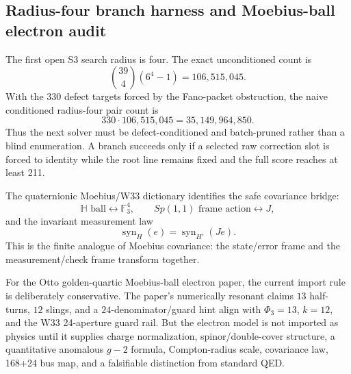 \subsection{Radius-four branch harness and Moebius-ball electron audit}
\label{sec:bt1435-bt1437-radius4-mobius-audit}

The first open S3 search radius is four.  The exact unconditioned count is
\[
\binom{39}{4}(6^4-1)=106{,}515{,}045.
\]
With the 330 defect targets forced by the Fano-packet obstruction, the naive
conditioned radius-four pair count is
\[
330\cdot106{,}515{,}045=35{,}149{,}964{,}850.
\]
Thus the next solver must be defect-conditioned and batch-pruned rather than a
blind enumeration.  A branch succeeds only if a selected raw correction slot is
forced to identity while the root line remains fixed and the full score reaches
at least 211.

The quaternionic Moebius/W33 dictionary identifies the safe covariance bridge:
\[
\mathbb H\text{ ball}\leftrightarrow\mathbb F_3^4,
\qquad
Sp(1,1)\text{ frame action}\leftrightarrow J,
\]
and the invariant measurement law
\[
\operatorname{syn}_{H}(e)=\operatorname{syn}_{H'}(Je).
\]
This is the finite analogue of Moebius covariance: the state/error frame and the
measurement/check frame transform together.

For the Otto golden-quartic Moebius-ball electron paper, the current import rule
is deliberately conservative.  The paper's numerically resonant claims
\(13\) half-turns, \(12\) slings, and a \(24\)-denominator/guard hint align with
\(\Phi_3=13\), \(k=12\), and the W33 24-aperture guard rail.  But the electron
model is not imported as physics until it supplies charge normalization,
spinor/double-cover structure, a quantitative anomalous \(g-2\) formula,
Compton-radius scale, covariance law, 168+24 bus map, and a falsifiable
distinction from standard QED.
